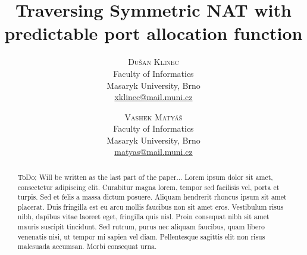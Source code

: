 \documentclass[twoside]{article}
\title{\vspace{-15mm}%
	\fontsize{24pt}{10pt}\selectfont
	\textbf{Traversing Symmetric NAT with predictable port allocation function}
	}
\author{%
	\large
	\textsc{Du\v{s}an Klinec} \\[2mm]%
	\normalsize	Faculty of Informatics \\
	\normalsize	Masaryk University, Brno \\
	\normalsize	\href{mailto:xklinec@mail.muni.cz}{xklinec@mail.muni.cz}
	\and
	\textsc{Vashek Matyáš} \\[2mm]%
	\normalsize	Faculty of Informatics \\
	\normalsize	Masaryk University, Brno \\
	\normalsize	\href{mailto:matyas@mail.muni.cz}{matyas@mail.muni.cz}
	\vspace{-5mm}
	}
\date{}
\begin{document}
\maketitle
\thispagestyle{fancy}

\begin{abstract}
\noindent ToDo; Will be written as the last part of the paper... Lorem ipsum dolor sit amet, consectetur adipiscing elit. Curabitur magna lorem, tempor sed facilisis vel, porta et turpis. Sed et felis a massa dictum posuere. Aliquam hendrerit rhoncus ipsum sit amet placerat. Duis fringilla est eu arcu mollis faucibus non sit amet eros. Vestibulum risus nibh, dapibus vitae laoreet eget, fringilla quis nisl. Proin consequat nibh sit amet mauris suscipit tincidunt. Sed rutrum, purus nec aliquam faucibus, quam libero venenatis nisi, ut tempor mi sapien vel diam. Pellentesque sagittis elit non risus malesuada accumsan. Morbi consequat urna.
\end{abstract}
	
\end{document}
